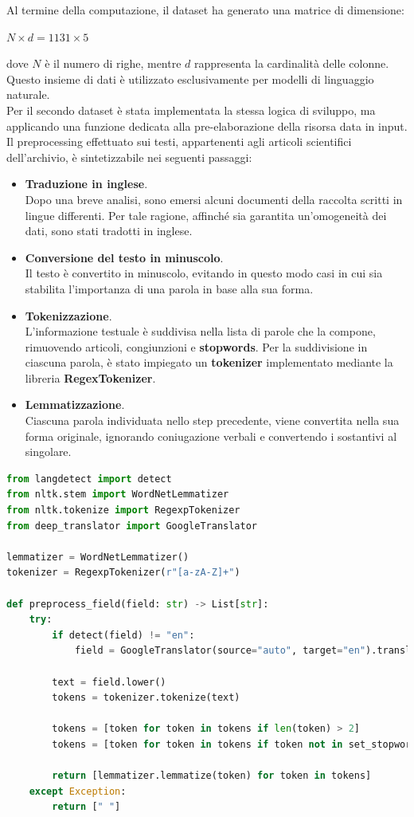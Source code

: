 Al termine della computazione, il dataset ha generato una matrice di dimensione:
\begin{center}
    $N\times d = 1131 \times 5$
\end{center}
dove $N$ è il numero di righe, mentre $d$ rappresenta la cardinalità delle colonne. Questo insieme di dati è utilizzato esclusivamente per modelli di linguaggio naturale. \\
Per il secondo dataset è stata implementata la stessa logica di sviluppo, ma applicando una funzione dedicata alla pre-elaborazione della risorsa data in input. Il preprocessing effettuato sui testi, appartenenti agli articoli scientifici dell'archivio, è sintetizzabile nei seguenti passaggi:
\begin{itemize}
    \renewcommand{\labelitemi}{-}
    \item \textbf{Traduzione in inglese}. \\
    Dopo una breve analisi, sono emersi alcuni documenti della raccolta scritti in lingue differenti. Per tale ragione, affinché sia garantita un'omogeneità dei dati, sono stati tradotti in inglese.
    \item \textbf{Conversione del testo in minuscolo}. \\
    Il testo è convertito in minuscolo, evitando in questo modo casi in cui sia stabilita l'importanza di una parola in base alla sua forma.
    \item \textbf{Tokenizzazione}. \\
    L'informazione testuale è suddivisa nella lista di parole che la compone, rimuovendo articoli, congiunzioni e \textbf{stopwords}. Per la suddivisione in ciascuna parola, è stato impiegato un \textbf{tokenizer} implementato mediante la libreria \textbf{RegexTokenizer}.
    \item \textbf{Lemmatizzazione}. \\
    Ciascuna parola individuata nello step precedente, viene convertita nella sua forma originale, ignorando coniugazione verbali e convertendo i sostantivi al singolare.
\end{itemize}
\begin{lstlisting}[language=python, caption=Preprocessing delle informazioni testuali]
from langdetect import detect
from nltk.stem import WordNetLemmatizer
from nltk.tokenize import RegexpTokenizer
from deep_translator import GoogleTranslator

lemmatizer = WordNetLemmatizer()
tokenizer = RegexpTokenizer(r"[a-zA-Z]+")

def preprocess_field(field: str) -> List[str]:
    try:
        if detect(field) != "en":
            field = GoogleTranslator(source="auto", target="en").translate(field)

        text = field.lower()
        tokens = tokenizer.tokenize(text)

        tokens = [token for token in tokens if len(token) > 2]
        tokens = [token for token in tokens if token not in set_stopwords]

        return [lemmatizer.lemmatize(token) for token in tokens]
    except Exception:
        return [" "]
\end{lstlisting}
